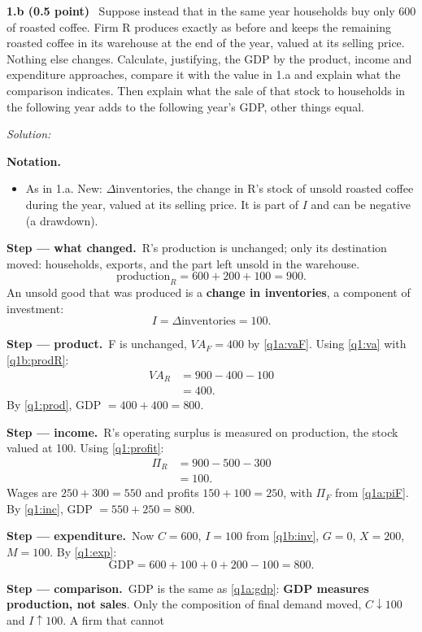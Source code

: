 \documentclass[11pt,a4paper]{article}
\newif\ifsolucoes
\newcommand{\sub}[2]{\Needspace{8\baselineskip}\par\medskip\noindent\textbf{#1 (#2)}~}
\newcommand{\resolespaco}[1][6cm]{\ifsolucoes\else\par\textit{Solution:}\vspace{#1}\par\fi}
\newcommand{\passo}[2]{\par\smallskip\noindent\textbf{Step --- #1.}~#2}
\newenvironment{notacao}{\par\smallskip\noindent\textbf{Notation.}\begin{itemize}[leftmargin=1.4em,topsep=1pt,itemsep=0pt]\small}{\end{itemize}}
\begin{document}
\sub{1.b}{0.5 point} Suppose instead that in the same year households buy only 600 of roasted
coffee. Firm R produces exactly as before and keeps the remaining roasted coffee in its warehouse at
the end of the year, valued at its selling price. Nothing else changes. Calculate, justifying, the
GDP by the product, income and expenditure approaches, compare it with the value in 1.a and explain
what the comparison indicates. Then explain what the sale of that stock to households in the
following year adds to the following year's GDP, other things equal.
\resolespaco[6cm]
\begin{sol}
\begin{notacao}
\item As in 1.a. New: $\Delta\text{inventories}$, the change in R's stock of unsold roasted coffee
during the year, valued at its selling price. It is part of $I$ and can be negative (a drawdown).
\end{notacao}
\passo{what changed}{R's production is unchanged; only its destination moved: households,
exports, and the part left unsold in the warehouse.}
\begin{equation}
\text{production}_R=600+200+100=900. \label{q1b:prodR}
\end{equation}
An unsold good that was produced is a \textbf{change in inventories}, a component of investment:
\begin{equation}
I=\Delta\text{inventories}=100. \label{q1b:inv}
\end{equation}
\passo{product}{F is unchanged, $VA_F=400$ by \eqref{q1a:vaF}. Using \eqref{q1:va} with
\eqref{q1b:prodR}:}
\begin{align*}
VA_R &= 900-400-100\\
&= 400.
\end{align*}
By \eqref{q1:prod}, GDP $=400+400=\boxed{800}$.
\passo{income}{R's operating surplus is measured on production, the stock valued at 100. Using
\eqref{q1:profit}:}
\begin{align*}
\Pi_R &= 900-500-300\\
&= 100.
\end{align*}
Wages are $250+300=550$ and profits $150+100=250$, with $\Pi_F$ from \eqref{q1a:piF}. By
\eqref{q1:inc}, GDP $=550+250=\boxed{800}$.
\passo{expenditure}{Now $C=600$, $I=100$ from \eqref{q1b:inv}, $G=0$, $X=200$, $M=100$. By
\eqref{q1:exp}:}
\[
\text{GDP}=600+100+0+200-100=\boxed{800}.
\]
\passo{comparison}{GDP is the same as \eqref{q1a:gdp}: \textbf{GDP measures production, not sales}.
Only the composition of final demand moved, $C\downarrow100$ and $I\uparrow100$. A firm that cannot
}
\end{sol}
\end{document}
